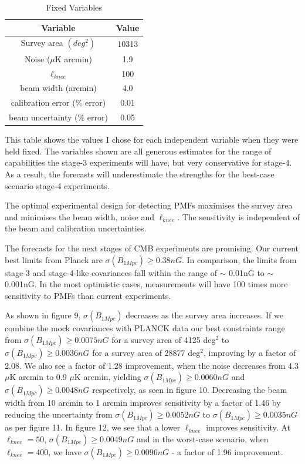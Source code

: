 \begin{table}[h]
\centering
\caption{Fixed Variables}

\label{my-label}
\begin{tabular}{l|l}
\multicolumn{1}{c}{Variable} & \multicolumn{1}{|c}{Value} \\ \hline
\multicolumn{1}{c}{Survey area $(deg^2)$} & \multicolumn{1}{|c}{10313}  \\
\multicolumn{1}{c}{Noise ($\mu$K arcmin)} & \multicolumn{1}{|c}{1.9}   \\
\multicolumn{1}{c}{$\ell_{knee}$} & \multicolumn{1}{|c}{100} \\
\multicolumn{1}{c}{beam width (arcmin)} & \multicolumn{1}{|c}{4.0}   \\
\multicolumn{1}{c}{calibration error (\% error)} & \multicolumn{1}{|c}{0.01} \\
\multicolumn{1}{c}{beam uncertainty (\% error)} & \multicolumn{1}{|c}{0.05}
\end{tabular}
\begin{flushleft}
This table shows the values I chose for each independent variable when they were held fixed. The variables shown are all generous estimates for the range of capabilities the stage-3 experiments will have, but very conservative for stage-4. As a result, the forecasts will underestimate the strengths for the best-case scenario stage-4 experiments.
\end{flushleft}
\end{table}

The optimal experimental design for detecting PMFs maximises the survey area and minimises the beam width, noise and $\ell_{knee}$. The sensitivity is independent of the beam and calibration uncertainties. 

The forecasts for the next stages of CMB experiments are promising. Our current best limits from Planck are $\sigma(B_{1Mpc}) \geq 0.38nG$. In comparison, the limits from stage-3 and stage-4-like covariances fall within the range of $\sim$ 0.01nG to $\sim$ 0.001nG. In the most optimistic cases, measurements will have 100 times more sensitivity to PMFs than current experiments.

As shown in figure 9, $\sigma(B_{1Mpc})$ decreases as the survey area increases. If we combine the mock covariances with PLANCK data our best constraints range from $\sigma(B_{1Mpc}) \geq 0.0075nG$ for a survey area of 4125 deg$^2$ to $\sigma(B_{1Mpc}) \geq 0.0036nG$ for a survey area of 28877 deg$^2$, improving by a factor of 2.08. We also see a factor of 1.28 improvement, when the noise decreases from 4.3 $\mu$K arcmin to 0.9 $\mu$K arcmin, yielding  $\sigma(B_{1Mpc}) \geq 0.0060nG$ and $\sigma(B_{1Mpc}) \geq 0.0048nG$ respectively, as seen in figure 10. Decreasing the beam width from 10 arcmin to 1 arcmin improves sensitivity by a factor of 1.46 by reducing the uncertainty from $\sigma(B_{1Mpc}) \geq 0.0052nG$ to $\sigma(B_{1Mpc}) \geq 0.0035nG$ as per figure 11. In figure 12, we see that a lower $\ell_{knee}$ improves sensitivity. At $\ell_{knee} = 50$, $\sigma(B_{1Mpc}) \geq 0.0049nG$ and in the worst-case scenario, when $\ell_{knee} = 400$, we have $\sigma(B_{1Mpc}) \geq 0.0096nG$ - a factor of 1.96 improvement.



